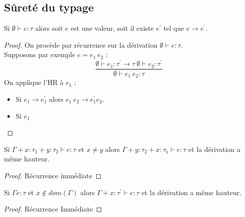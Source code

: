 \documentclass{cours}
\begin{document}
\subsection{Sûreté du typage}
\begin{lemma}[Progression]
    Si $\emptyset \vdash e : \tau$ alors soit $e$ est une valeur, soit il existe $e^{'}$ tel que $e \rightarrow e^{'}$.
\end{lemma}
\begin{proof}
    On procède par récurrence sur la dérivation $\emptyset \vdash e : \tau$.\\
    Supposons par exemple $e = e_{1} \ e_{2}$ :
    \[
        \frac{\emptyset \vdash e_{1} : \tau^{'} \rightarrow \tau \ \emptyset \vdash e_{2} : \tau^{'}}{\emptyset \vdash e_{1} \ e_{2} : \tau}
    \]
    On applique l'HR à $e_{1}$ :
    \begin{itemize}
        \item Si $e_{1} \rightarrow e_{1}^{'}$ alors $e_{1} \ e_{2} \rightarrow e_{1}^{'} e_{2}$. %
        \item Si $e_{1}$
    \end{itemize}
\end{proof}

\begin{lemma}[Permutation]
    Si $\Gamma + x : \tau_{1} + y : \tau_{2} \vdash e : \tau$ et $x \neq y$ alors $\Gamma + y : \tau_{2} + x : \tau_{1} \vdash e : \tau$ et la dérivation a même hauteur.
\end{lemma}
\begin{proof}
    Récurrence immédiate
\end{proof}

\begin{lemma}[Affaiblissement]
    Si $\Gamma e : \tau$ et $x \notin dom(\Gamma)$ alors $\Gamma + x : \tau^{'} \vdash e : \tau$ et la dérivation a même hauteur.
\end{lemma}
\begin{proof}
    Récurrence Immédiate
\end{proof}
\end{document}
